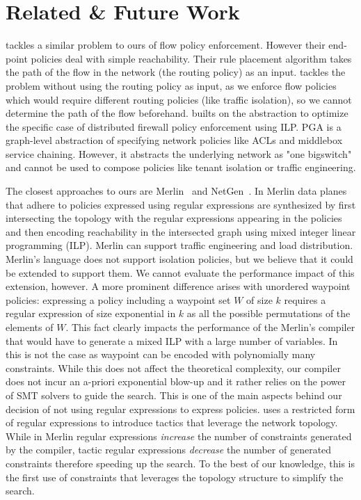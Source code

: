 \section{Related \& Future Work} \label{sec:relatedwork}

\cite{oneswitch} tackles a similar problem to ours of flow policy
enforcement. However their end-point policies deal with simple
reachability. Their rule placement algorithm takes the path of the
flow in the network  (the routing policy) as an input.%
\Name tackles the
problem without using the routing policy as input, as we enforce flow
policies which would require different routing policies (like traffic
isolation), so we cannot determine the path of the flow
beforehand. %
\cite{distfirewall} builts on the
\cite{oneswitch} abstraction to optimize the specific case of
distributed firewall policy enforcement using ILP.  PGA \cite{pga} is
a graph-level abstraction of specifying network policies like ACLs and
middlebox service chaining. However, it abstracts the underlying
network as "one bigswitch" and cannot be used to compose policies like
tenant isolation or traffic engineering.

The closest approaches to ours are Merlin~\cite{merlin} and
NetGen~\cite{netgen}.  In Merlin data planes that adhere to policies
expressed using regular expressions are synthesized by first
intersecting the topology with the regular expressions appearing in
the policies and then encoding reachability in the intersected graph
using mixed integer linear programming (ILP).
Merlin can support traffic engineering and load distribution.
Merlin's language does not support isolation policies, but we believe
that it could be extended to support them.  We cannot evaluate the
performance impact of this extension, however.  A more prominent
difference arises with unordered waypoint policies: expressing a
policy including a waypoint set $W$ of size $k$ requires a regular
expression of size exponential in $k$ as all the possible permutations
of the elements of $W$. This fact clearly impacts the performance of
the Merlin's compiler that would have to generate a mixed ILP with a
large number of variables.  In \Name this is not the case as waypoint
can be encoded with polynomially many constraints.  While this does
not affect the theoretical complexity, our compiler does not incur
an a-priori exponential blow-up and it rather relies on the power
of SMT solvers to guide the search.  This is one of the main aspects
behind our decision of not using regular expressions to express
policies.  \Name uses a restricted form of regular expressions to
introduce tactics that leverage the network topology.  While in Merlin
regular expressions \emph{increase} the number of constraints
generated by the compiler, tactic regular expressions \emph{decrease}
the number of generated constraints therefore speeding up the search.
To the best of our knowledge, this is the first use of constraints
that leverages the topology structure to simplify the search.

